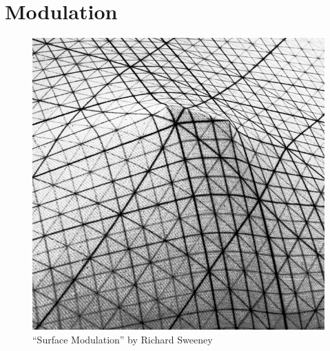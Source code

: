 
\chapter{Modulation}
\label{Modulation}


\begin{figure}[H]
	\begin{center}
		\includegraphics[width = 14cm]{img/surface-modulation_3.jpg}
		\caption{``Surface Modulation'' by Richard Sweeney}
		\label{fig:Surface Modulation}
	\end{center}
\end{figure}


